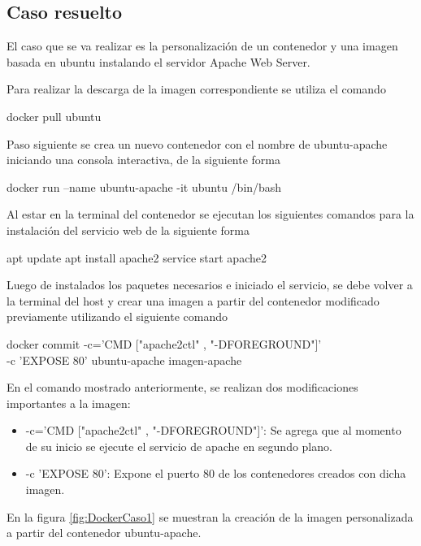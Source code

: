 \subsection{Caso resuelto}
El caso que se va realizar es la personalización de un contenedor y una imagen basada en ubuntu instalando el servidor Apache Web Server.

Para realizar la descarga de la imagen correspondiente se utiliza el comando
\begin{commandshell} docker pull ubuntu \end{commandshell}

Paso siguiente se crea un nuevo contenedor con el nombre de ubuntu-apache iniciando una consola interactiva, de la siguiente forma

\begin{commandshell} docker run --name ubuntu-apache -it ubuntu /bin/bash \end{commandshell}

Al estar en la terminal del contenedor se ejecutan los siguientes comandos para la instalación del servicio web de la siguiente forma 
\begin{commandshellroot}
apt update
apt install apache2
service start apache2
\end{commandshellroot}

Luego de instalados los paquetes necesarios e iniciado el servicio, se debe volver a la terminal del host y crear una imagen a partir del contenedor modificado previamente utilizando el siguiente comando

\begin{commandshell}
docker commit -c='CMD ["apache2ctl" , "-DFOREGROUND"]' \\
    -c 'EXPOSE 80' ubuntu-apache imagen-apache
\end{commandshell}

En el comando mostrado anteriormente, se realizan dos modificaciones importantes a la imagen: 
\begin{itemize}
    \item -c='CMD ["apache2ctl" , "-DFOREGROUND"]': Se agrega que al momento de su inicio se ejecute el servicio de apache en segundo plano.
    \item -c 'EXPOSE 80': Expone el puerto 80 de los contenedores creados con dicha imagen.
\end{itemize}

En la figura \ref{fig:DockerCaso1} se muestran la creación de la imagen personalizada a partir del contenedor ubuntu-apache.

